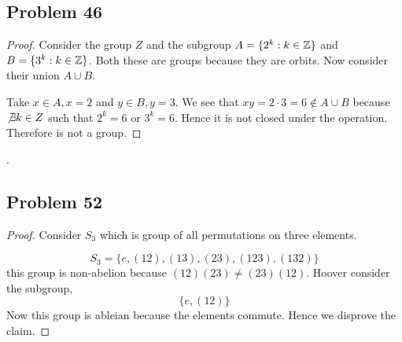 \documentclass[a4paper]{report}
\begin{document}
\subsection*{Problem 46}

\begin{proof}
    Consider the group $Z$ and the subgroup $A = \{2^{k} : k \in \mathbb{Z}\}$ and $B = \{3^{k}: k \in \mathbb{Z}\}$. Both these are groups because they are orbits. Now consider their union $A \cup B$. 

    Take  $x \in A, x = 2$  and $y \in B, y = 3$. We see that  $xy = 2 \cdot 3 = 6 \not \in A \cup B$ because  $ \not \exists k \in Z$ such that $2^{k} = 6$ or $3^{k} = 6$. Hence it is not closed under the operation. Therefore is not a group.
\end{proof}. 
\subsection*{Problem 52}
\begin{proof}
    Consider $S_3$ which is group of all permutations on three elements.
    
    $$ S_3 = \{e, (12), (13), (23), (123),(132)\} $$ 
    this group is non-abelion because $(12)(23) \ne (23)(12)$. Hoover consider the subgroup,  
    $$ \{e, (12)\} $$ 
    Now this group is ableian  because the elements commute. Hence we disprove the claim.
\end{proof}
\end{document}
